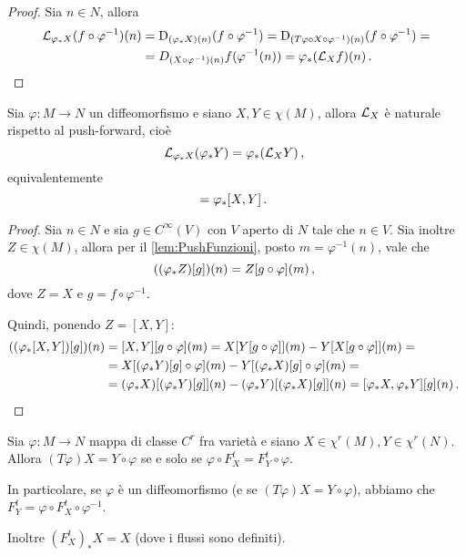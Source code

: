 \begin{proof}
	Sia $n\in N$, allora
	\begin{align*}
		\mathcal L_{\varphi_*X}(f\circ \varphi^{-1})(n)&=\mathrm D_{(\varphi_*X)(n)}(f\circ \varphi^{-1})=\mathrm D_{(T\varphi \circ X \circ\varphi^{-1})(n)}(f\circ \varphi^{-1})=\\
		&=D_{(X\circ \varphi^{-1})(n)} f(\varphi^{-1}(n))=\varphi_*(\mathcal L_Xf)(n)\, \text{. }
	\end{align*}
\end{proof}


\begin{proposition}
	Sia $\varphi:M\to N$ un diffeomorfismo e siano $X,Y\in\chi(M)$, allora $\mathcal L_X$ è naturale rispetto al push-forward, cioè
	\begin{equation*}
		\mathcal L_{\varphi_*X}(\varphi_*Y)=\varphi_*(\mathcal L_XY)\, \text{, }
	\end{equation*}
	equivalentemente
	\begin{equation*}
		[\varphi_*X,\varphi_*Y]=\varphi_*[X,Y]\punto
	\end{equation*}
\end{proposition}

\begin{proof}
	Sia $n\in N$ e sia $g\in C^\infty(V)$ con $V$ aperto di $N$ tale che $n\in V$. Sia inoltre $Z\in\chi(M)$, allora per il \cref{lem:PushFunzioni}, posto $m=\varphi^{-1}(n)$, vale che
	\begin{equation*}
		((\varphi_*Z)[g])(n)=Z[g\circ \varphi](m)\, \text{, }
	\end{equation*}
	dove $Z=X$ e $g=f\circ \varphi^{-1}$.
	
	Quindi, ponendo $Z=[X,Y]$:
	\begin{align*}
	((\varphi_*[X,Y])[g])(n)&=[X,Y][g\circ \varphi](m)=X[Y[g\circ \varphi]](m)-Y[X[g\circ \varphi]](m)=\\
	&=X[(\varphi_*Y)[g]\circ \varphi](m)-Y[(\varphi_*X)[g]\circ \varphi](m) =\\
	&= (\varphi_*X)[(\varphi_*Y)[g]](n)-(\varphi_*Y)[(\varphi_*X)[g]](n) = [\varphi_* X, \varphi_* Y][g](n)\, \text{. }
	\end{align*}
\end{proof}

\begin{lemma}
	Sia $\varphi:M\to N$ mappa di classe $C^r$ fra varietà e siano $X\in\chi^r(M),Y\in\chi^r(N)$. Allora $(T\varphi)X=Y\circ \varphi$ se e solo se $\varphi\circ F_X^t=F_Y^t\circ\varphi$.
	
	In particolare, se $\varphi$ è un diffeomorfismo (e se $(T\varphi)X=Y\circ \varphi$), abbiamo che \\
	$F_Y^t=\varphi\circ F_X^t\circ \varphi^{-1}$.
	
	Inoltre $(F_X^t)_*X=X$ (dove i flussi sono definiti).
\end{lemma}

